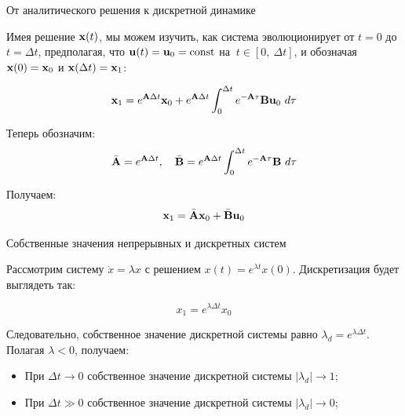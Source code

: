 \documentclass{beamer}
\begin{document}
\begin{frame}{От аналитического решения к дискретной динамике}
	\begin{flushleft}
		
		Имея решение $\mathbf{x}(t)$, мы можем изучить, как система эволюционирует от $t=0$ до $t=\Delta t$, предполагая, что $\mathbf{u}(t) = \mathbf{u}_0 = \text{const}$ на $\ t \in [ 0, \ \Delta t ]$, и обозначая $\mathbf{x}(0) = \mathbf{x}_0$ и $\mathbf{x}(\Delta t) = \mathbf{x}_1$:
		
		\begin{equation}
			\mathbf{x}_1 = e^{\mathbf{A}\Delta t}  \mathbf{x}_0 + 
			e^{\mathbf{A} \Delta t} \int_{0}^{\Delta t} e^{-\mathbf{A}\tau} \mathbf{B}  \mathbf{u}_0 \ d \tau
		\end{equation}
		
		Теперь обозначим:
		\begin{align}
			\bar{\mathbf{A}} = e^{\mathbf{A}\Delta t}, \ \ \
			\bar{\mathbf{B}} = e^{\mathbf{A} \Delta t} \int_{0}^{\Delta t} e^{-\mathbf{A}\tau} \mathbf{B} \ d\tau
		\end{align}
		
		Получаем:
		\begin{equation}
			\mathbf{x}_1 = \bar{\mathbf{A}}  \mathbf{x}_0 + \bar{\mathbf{B}}  \mathbf{u}_0
		\end{equation}		
		
	\end{flushleft}
\end{frame}

\begin{frame}{Собственные значения непрерывных и дискретных систем}
	\begin{flushleft}
		
		Рассмотрим систему $\dot{x} = \lambda x$ с решением $x(t) = e^{ \lambda t} x(0)$. Дискретизация будет выглядеть так:
		
		\begin{equation}
			x_1 =e^{ \lambda \Delta t}   x_0 
		\end{equation}
		
		Следовательно, собственное значение дискретной системы равно $\lambda_d = e^{ \lambda \Delta t} $. Полагая $\lambda < 0$, получаем:
		
		\begin{itemize}
			\item При $\Delta t \rightarrow 0$ собственное значение дискретной системы $|\lambda_d| \rightarrow 1$;
			
			\item При $\Delta t \gg 0$ собственное значение дискретной системы $|\lambda_d| \rightarrow 0$;
		\end{itemize}
		
	\end{flushleft}
\end{frame}
\end{document}
